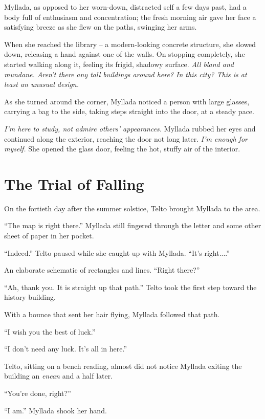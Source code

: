 Myllada, as opposed to her worn-down, distracted self a few days past, had a body full of enthusiasm and concentration; the fresh morning air gave her face a satisfying breeze as she flew on the paths, swinging her arms.

When she reached the library -- a modern-looking concrete structure, she slowed down, releasing a hand against one of the walls. On stopping completely, she started walking along it, feeling its frigid, shadowy surface. \emph{All bland and mundane. Aren't there any tall buildings around here? In this city? This is at least an unusual design.}

As she turned around the corner, Myllada noticed a person with large glasses, carrying a bag to the side, taking steps straight into the door, at a steady pace.

\emph{I'm here to study, not admire others' appearances.} Myllada rubbed her eyes and continued along the exterior, reaching the door not long later. \emph{I'm enough for myself.} She opened the glass door, feeling the hot, stuffy air of the interior.

\chapter{The Trial of Falling}

On the fortieth day after the summer solstice, Telto brought Myllada to the area.

``The map is right there.'' Myllada still fingered through the letter and some other sheet of paper in her pocket.

``Indeed.'' Telto paused while she caught up with Myllada. ``It's right....''

An elaborate schematic of rectangles and lines. ``Right there?''

``Ah, thank you. It is straight up that path.'' Telto took the first step toward the history building.

With a bounce that sent her hair flying, Myllada followed that path.

``I wish you the best of luck.''

``I don't need any luck. It's all in here.''

\centeredstars

Telto, sitting on a bench reading, almost did not notice Myllada exiting the building an \emph{enean} and a half later.

``You're done, right?''

``I am.'' Myllada shook her hand.

